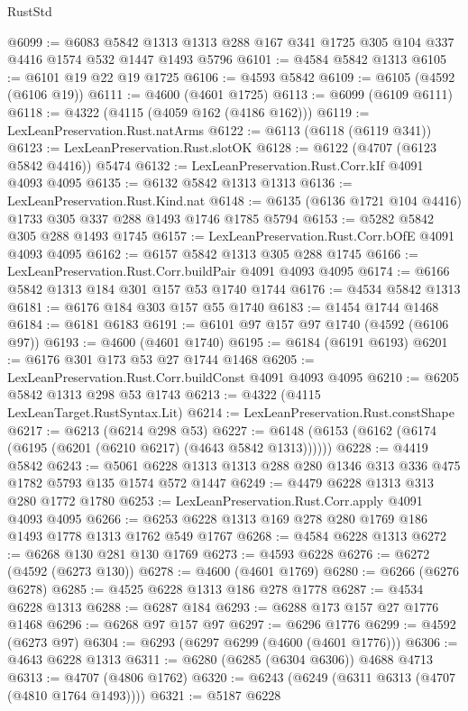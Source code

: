\begin{lexlean}{RustStd}
\begin{coremodule}
@6099 := @6083
    @5842
    @1313
    @1313
    @288
    @167
    @341
    @1725
    @305
    @104
    @337
    @4416
    @1574
    @532
    @1447
    @1493
    @5796
@6101 := @4584 @5842 @1313
@6105 := @6101 @19 @22 @19 @1725
@6106 := @4593 @5842
@6109 := @6105 (@4592 (@6106 @19))
@6111 := @4600 (@4601 @1725)
@6113 := @6099 (@6109 @6111)
@6118 := @4322 (@4115 (@4059 @162 (@4186 @162)))
@6119 := LexLeanPreservation.Rust.natArms
@6122 := @6113 (@6118 (@6119 @341))
@6123 := LexLeanPreservation.Rust.slotOK
@6128 := @6122 (@4707 (@6123 @5842 @4416)) @5474
@6132 := LexLeanPreservation.Rust.Corr.kIf @4091 @4093 @4095
@6135 := @6132 @5842 @1313 @1313
@6136 := LexLeanPreservation.Rust.Kind.nat
@6148 := @6135 (@6136 @1721 @104 @4416) @1733 @305 @337 @288 @1493 @1746 @1785 @5794
@6153 := @5282 @5842 @305 @288 @1493 @1745
@6157 := LexLeanPreservation.Rust.Corr.bOfE @4091 @4093 @4095
@6162 := @6157 @5842 @1313 @305 @288 @1745
@6166 := LexLeanPreservation.Rust.Corr.buildPair @4091 @4093 @4095
@6174 := @6166 @5842 @1313 @184 @301 @157 @53 @1740 @1744
@6176 := @4534 @5842 @1313
@6181 := @6176 @184 @303 @157 @55 @1740
@6183 := @1454 @1744 @1468
@6184 := @6181 @6183
@6191 := @6101 @97 @157 @97 @1740 (@4592 (@6106 @97))
@6193 := @4600 (@4601 @1740)
@6195 := @6184 (@6191 @6193)
@6201 := @6176 @301 @173 @53 @27 @1744 @1468
@6205 := LexLeanPreservation.Rust.Corr.buildConst @4091 @4093 @4095
@6210 := @6205 @5842 @1313 @298 @53 @1743
@6213 := @4322 (@4115 LexLeanTarget.RustSyntax.Lit)
@6214 := LexLeanPreservation.Rust.constShape
@6217 := @6213 (@6214 @298 @53)
@6227 := @6148 (@6153 (@6162 (@6174 (@6195 (@6201 (@6210 @6217) (@4643 @5842 @1313))))))
@6228 := @4419 @5842
@6243 := @5061 @6228 @1313 @1313 @288 @280 @1346 @313 @336 @475 @1782 @5793 @135 @1574 @572 @1447
@6249 := @4479 @6228 @1313 @313 @280 @1772 @1780
@6253 := LexLeanPreservation.Rust.Corr.apply @4091 @4093 @4095
@6266 := @6253 @6228 @1313 @169 @278 @280 @1769 @186 @1493 @1778 @1313 @1762 @549 @1767
@6268 := @4584 @6228 @1313
@6272 := @6268 @130 @281 @130 @1769
@6273 := @4593 @6228
@6276 := @6272 (@4592 (@6273 @130))
@6278 := @4600 (@4601 @1769)
@6280 := @6266 (@6276 @6278)
@6285 := @4525 @6228 @1313 @186 @278 @1778
@6287 := @4534 @6228 @1313
@6288 := @6287 @184
@6293 := @6288 @173 @157 @27 @1776 @1468
@6296 := @6268 @97 @157 @97
@6297 := @6296 @1776
@6299 := @4592 (@6273 @97)
@6304 := @6293 (@6297 @6299 (@4600 (@4601 @1776)))
@6306 := @4643 @6228 @1313
@6311 := @6280 (@6285 (@6304 @6306)) @4688 @4713
@6313 := @4707 (@4806 @1762)
@6320 := @6243 (@6249 (@6311 @6313 (@4707 (@4810 @1764 @1493))))
@6321 := @5187 @6228

\end{coremodule}
\end{lexlean}
